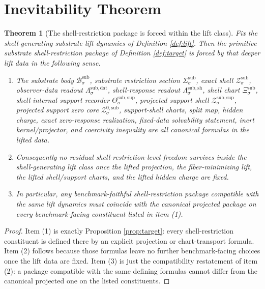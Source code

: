 \documentclass[11pt]{article}
\newcommand{\SubBody}[1]{\mathcal B_{#1}^{\mathrm{sub}}}
\newcommand{\SubSection}[1]{\Sigma_{#1}^{\mathrm{sub}}}
\newcommand{\SubShellSet}[1]{\mathcal Z_{#1}^{\mathrm{sub}}}
\newcommand{\SubData}[1]{\Lambda_{#1}^{\mathrm{sub,dat}}}
\newcommand{\SubShellMap}[1]{\Lambda_{#1}^{\mathrm{sub,sh}}}
\newcommand{\SubChart}[1]{\Xi_{#1}^{\mathrm{sub}}}
\newcommand{\SubSupport}[1]{\Theta_{#1}^{\mathrm{sub,sup}}}
\newcommand{\SubSupportShell}[1]{\mathcal Z_{#1}^{\mathrm{sub,sup}}}
\newcommand{\SubZeroCore}[1]{\mathcal Z_{#1}^{0,\mathrm{sub}}}
\newtheorem{theorem}{Theorem}
\begin{document}
\section{Inevitability Theorem}

\begin{theorem}[The shell-restriction package is forced within the lift class]
\label{thm:inevitability}
Fix the shell-generating substrate lift dynamics of Definition \ref{def:lift}. Then the primitive substrate shell-restriction package of Definition \ref{def:target} is forced by that deeper lift data in the following sense.
\begin{enumerate}
    \item The substrate body \(\SubBody{\sigma}\), substrate restriction section \(\SubSection{\sigma}\), exact shell \(\SubShellSet{\sigma}\), observer-data readout \(\SubData{\sigma}\), shell-response readout \(\SubShellMap{\sigma}\), shell chart \(\SubChart{\sigma}\), shell-internal support recorder \(\SubSupport{\sigma}\), projected support shell \(\SubSupportShell{\sigma}\), projected support zero core \(\SubZeroCore{\sigma}\), support-shell charts, split map, hidden charge, exact zero-response realization, fixed-data solvability statement, inert kernel/projector, and coercivity inequality are all canonical formulas in the lifted data.
    \item Consequently no residual shell-restriction-level freedom survives inside the shell-generating lift class once the lifted projection, the fiber-minimizing lift, the lifted shell/support charts, and the lifted hidden charge are fixed.
    \item In particular, any benchmark-faithful shell-restriction package compatible with the same lift dynamics must coincide with the canonical projected package on every benchmark-facing constituent listed in item (1).
\end{enumerate}
\end{theorem}

\begin{proof}
Item (1) is exactly Proposition \ref{prop:target}: every shell-restriction constituent is defined there by an explicit projection or chart-transport formula. Item (2) follows because those formulas leave no further benchmark-facing choices once the lift data are fixed. Item (3) is just the compatibility restatement of item (2): a package compatible with the same defining formulas cannot differ from the canonical projected one on the listed constituents.
\end{proof}
\end{document}
